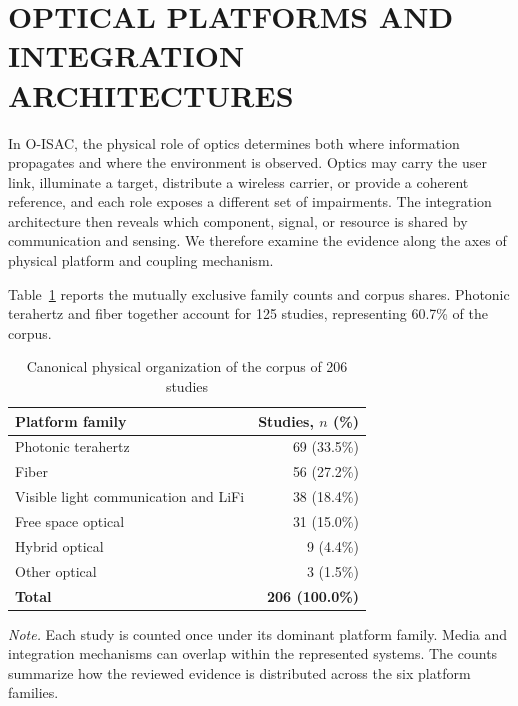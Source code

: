 \section{OPTICAL PLATFORMS AND INTEGRATION ARCHITECTURES}
\label{sec:optical_modality_families}
\label{sec:integration_architectures}

In O-ISAC, the physical role of optics determines both where information
propagates and where the environment is observed. Optics may carry the user
link, illuminate a target, distribute a wireless carrier, or provide a coherent
reference, and each role exposes a different set of impairments. The integration
architecture then reveals which component, signal, or resource is shared by
communication and sensing. We therefore examine the evidence along the axes of
physical platform and coupling mechanism.

Table~\ref{tab:modality_map} reports the mutually exclusive family counts and
corpus shares. Photonic terahertz and fiber together account for 125 studies,
representing 60.7\% of the corpus.

\begin{table}[t]
\caption{Canonical physical organization of the corpus of 206 studies}
\label{tab:modality_map}
\centering
\footnotesize
\setlength{\tabcolsep}{4pt}
\renewcommand{\arraystretch}{1.06}
\begin{tabularx}{\columnwidth}{@{}>{\raggedright\arraybackslash}X r@{}}
\toprule
Platform family & Studies, $n$ (\%) \\
\midrule
Photonic terahertz & 69 (33.5\%) \\
Fiber & 56 (27.2\%) \\
Visible light communication and LiFi & 38 (18.4\%) \\
Free space optical & 31 (15.0\%) \\
Hybrid optical & 9 (4.4\%) \\
Other optical & 3 (1.5\%) \\
\midrule
\textbf{Total} & \textbf{206 (100.0\%)} \\
\bottomrule
\end{tabularx}
\vspace{1pt}
\parbox{\columnwidth}{\footnotesize\emph{Note.} Each study is counted once under
its dominant platform family. Media and integration mechanisms can overlap
within the represented systems. The counts summarize how the reviewed evidence
is distributed across the six platform families.}
\end{table}

